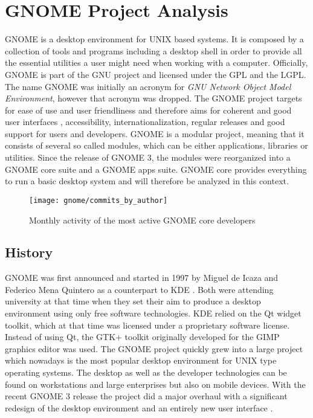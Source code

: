 \section{GNOME Project Analysis} %


GNOME is a desktop environment for UNIX based systems. It is composed by a
collection of tools and programs including a desktop shell in order to provide
all the essential utilities a user might need when working with a computer.
Officially, GNOME is part of the GNU project and licensed under the \ac{GPL}
and the \ac{LGPL}. The name GNOME was initially an acronym for \emph{GNU
Network Object Model Environment}, however that acronym was dropped. The GNOME
project targets for ease of use and user friendliness and therefore aims for
coherent and good user interfaces \cite{GNOMEHIG}, accessibility,
internationalization, regular releases and good support for users and
developers. GNOME is a modular project, meaning that it consists of several so
called modules, which can be either applications, libraries or utilities. Since
the release of GNOME 3, the modules were reorganized into a GNOME core suite
and a GNOME apps suite. GNOME core provides everything to run a basic desktop
system and will therefore be analyzed in this context.

\begin{figure}[htbp]
  \centering
  \texttt{[image: gnome/commits\_by\_author]}
  \caption{Monthly activity of the most active GNOME core developers}
\end{figure}

\subsection{History} %

GNOME was first announced and started in 1997 by Miguel de Icaza and Federico
Mena Quintero as a counterpart to KDE
\cite{German2003,GNOMEAbout,GNOMEAnnouncement}. Both were attending university
at that time when they set their aim to produce a desktop environment using
only free software technologies. KDE relied on the Qt widget toolkit, which at
that time was licensed under a proprietary software license. Instead of using
Qt, the GTK+ toolkit originally developed for the GIMP graphics editor was
used. The GNOME project quickly grew into a large project which nowadays is the
most popular desktop environment for UNIX type operating systems. The desktop
as well as the developer technologies can be found on workstations and large
enterprises but also on mobile devices. With the recent GNOME 3 release the
project did a major overhaul with a significant redesign of the desktop
environment and an entirely new user interface \cite{GNOMEPress}.

